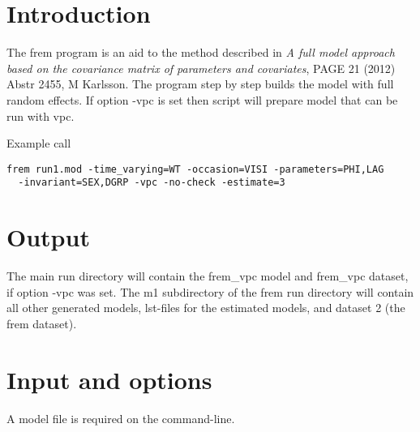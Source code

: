 



\newcommand{\guidetoolname}{frem}

\maketitle


\section{Introduction}
The frem program is an aid to the method described in
\emph{A full model approach based on the covariance matrix of parameters and covariates},
PAGE 21 (2012) Abstr 2455, M Karlsson. 
The program step by step builds the model with full random effects.
If option -vpc is set then script will prepare model that can be run with vpc.

Example call
\begin{verbatim}
frem run1.mod -time_varying=WT -occasion=VISI -parameters=PHI,LAG 
  -invariant=SEX,DGRP -vpc -no-check -estimate=3
\end{verbatim}

\section{Output}
The main run directory will contain the frem\_vpc model and frem\_vpc dataset, if option -vpc was set.
The m1 subdirectory of the frem run directory will contain all other generated models, 
lst-files for the estimated models, and dataset 2 (the frem dataset). 

\section{Input and options}
A model file is required on the command-line.

